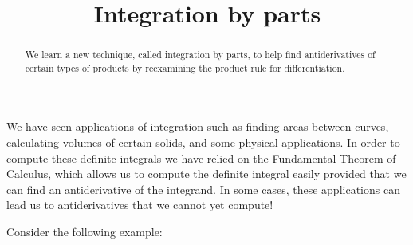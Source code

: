 \documentclass{ximera}
\title[Dig-In:]{Integration by parts}
\begin{document}
\begin{abstract}
  We learn a new technique, called integration by parts, to help find antiderivatives of certain types of products by reexamining the product rule for differentiation.
\end{abstract}
\maketitle

We have seen applications of integration such as finding areas between curves, calculating volumes of certain solids, and some physical applications. In order to compute these definite integrals we have relied on the Fundamental Theorem of Calculus, which allows us to compute the definite integral easily provided that we can find an antiderivative of the integrand.  In some cases, these applications can lead us to antiderivatives that we cannot yet compute!

Consider the following example:
\end{document}

